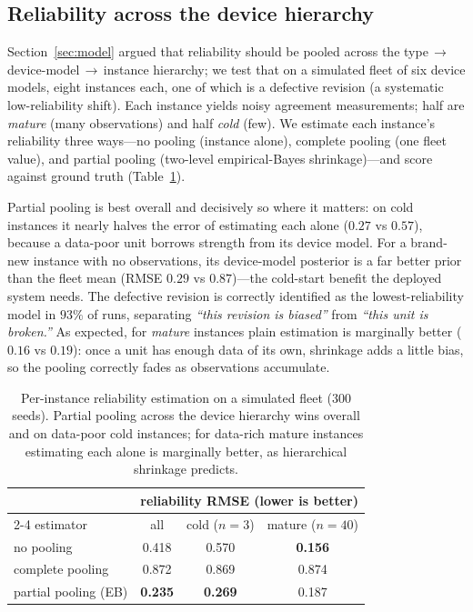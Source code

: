 \documentclass[10pt]{article}
\begin{document}
\subsection{Reliability across the device hierarchy}
\label{sec:hier}
Section~\ref{sec:model} argued that reliability should be pooled across the
type\,$\to$\,device-model\,$\to$\,instance hierarchy; we test that on a simulated
fleet of six device models, eight instances each, one of which is a defective
revision (a systematic low-reliability shift). Each instance yields noisy agreement
measurements; half are \emph{mature} (many observations) and half \emph{cold}
(few). We estimate each instance's reliability three ways---no pooling (instance
alone), complete pooling (one fleet value), and partial pooling (two-level
empirical-Bayes shrinkage)---and score against ground truth
(Table~\ref{tab:hier}).

Partial pooling is best overall and decisively so where it matters: on cold
instances it nearly halves the error of estimating each alone ($0.27$ vs $0.57$),
because a data-poor unit borrows strength from its device model. For a brand-new
instance with no observations, its device-model posterior is a far better prior
than the fleet mean (RMSE $0.29$ vs $0.87$)---the cold-start benefit the deployed
system needs. The defective revision is correctly identified as the
lowest-reliability model in $93\%$ of runs, separating \emph{``this revision is
biased''} from \emph{``this unit is broken.''} As expected, for \emph{mature}
instances plain estimation is marginally better ($0.16$ vs $0.19$): once a unit has
enough data of its own, shrinkage adds a little bias, so the pooling correctly
fades as observations accumulate.

\begin{table}[t]
\centering
\small
\begin{tabular}{@{}lccc@{}}
\toprule
& \multicolumn{3}{c}{reliability RMSE (lower is better)} \\
\cmidrule(lr){2-4}
estimator & all & cold ($n{=}3$) & mature ($n{=}40$) \\
\midrule
no pooling & 0.418 & 0.570 & \textbf{0.156} \\
complete pooling & 0.872 & 0.869 & 0.874 \\
partial pooling (EB) & \textbf{0.235} & \textbf{0.269} & 0.187 \\
\bottomrule
\end{tabular}
\caption{Per-instance reliability estimation on a simulated fleet (300 seeds).
Partial pooling across the device hierarchy wins overall and on data-poor cold
instances; for data-rich mature instances estimating each alone is marginally
better, as hierarchical shrinkage predicts.}
\label{tab:hier}
\end{table}
\end{document}
